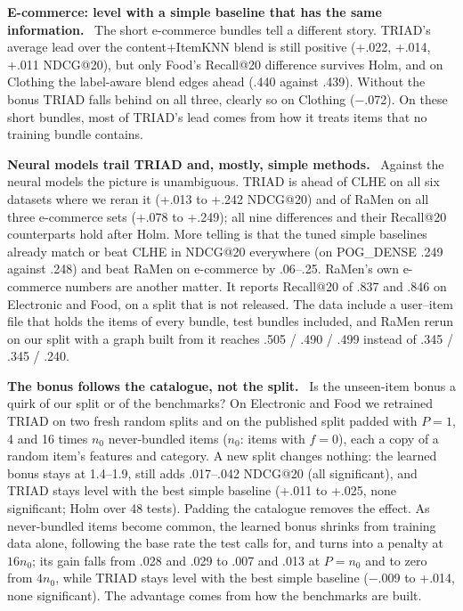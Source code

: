 \documentclass[runningheads]{llncs}
\renewcommand{\paragraph}[1]{\smallskip\noindent\textbf{#1}\ }
\begin{document}
\paragraph{E-commerce: level with a simple baseline that has the same information.} The short e-commerce bundles
tell a different story. TRIAD's average lead over the content+ItemKNN blend is still positive (+.022, +.014, +.011
NDCG@20), but only Food's Recall@20 difference survives Holm, and on Clothing the label-aware blend edges ahead (.440
against .439). Without the bonus TRIAD falls behind on all three, clearly so on Clothing ($-$.072). On these short
bundles, most of TRIAD's lead comes from how it treats items that no training bundle contains.

\paragraph{Neural models trail TRIAD and, mostly, simple methods.} Against the neural models the picture is
unambiguous. TRIAD is ahead of CLHE on all six datasets where we reran it (+.013 to +.242 NDCG@20) and of RaMen on all
three e-commerce sets (+.078 to +.249); all nine differences and their Recall@20 counterparts hold after Holm. More
telling is that the tuned simple baselines already match or beat CLHE in NDCG@20 everywhere (on POG\_DENSE .249
against .248) and beat RaMen on e-commerce by .06--.25. RaMen's own e-commerce numbers are another matter. It reports Recall@20 of .837 and .846 on Electronic and
Food, on a split that is not released. The data include a user--item file that holds the items of every bundle, test
bundles included, and RaMen rerun on our split with a graph built from it reaches .505 / .490 / .499 instead of
.345 / .345 / .240.

\paragraph{The bonus follows the catalogue, not the split.} Is the unseen-item bonus a quirk of our split or of the
benchmarks? On Electronic and Food we retrained TRIAD on two fresh random splits and on the published split padded
with $P=1$, 4 and 16 times $n_0$ never-bundled items ($n_0$: items with $f=0$), each a copy of a random item's
features and category. A new split changes nothing: the learned bonus stays at 1.4--1.9, still adds .017--.042
NDCG@20 (all significant), and TRIAD stays level with the best simple baseline (+.011 to +.025, none significant;
Holm over 48 tests). Padding the catalogue removes the effect. As never-bundled items become common, the learned bonus
shrinks from training data alone, following the base rate the test calls for, and turns into a penalty at $16n_0$;
its gain falls from .028 and .029 to .007 and .013 at $P=n_0$ and to zero from $4n_0$, while TRIAD stays level with
the best simple baseline ($-$.009 to +.014, none significant). The advantage comes from how the benchmarks are built.
\end{document}
